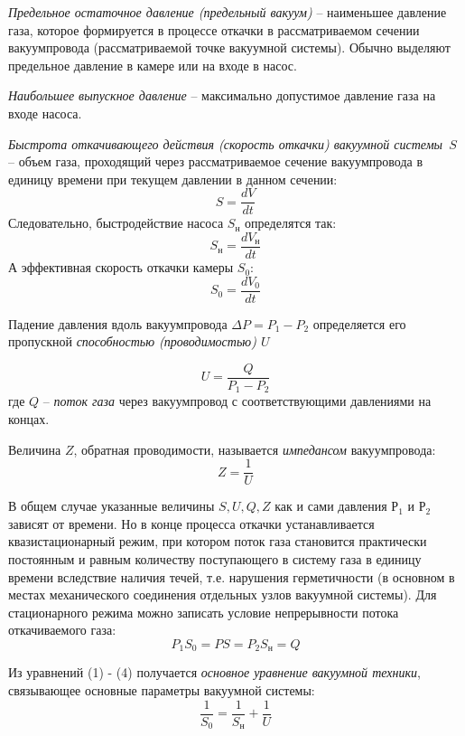 \documentclass[a4paper,12pt]{article}
\theoremstyle{plain} %
\theoremstyle{definition} %
\theoremstyle{remark} %
\begin{document}
\textit{Предельное остаточное давление (предельный вакуум)} -- наименьшее давление газа, которое формируется в процессе откачки в рассматриваемом сечении вакуумпровода (рассматриваемой точке вакуумной системы). Обычно выделяют предельное давление в камере или на входе в насос.

\textit{Наибольшее выпускное давление}  -- максимально допустимое давление газа на входе насоса.  

\textit{Быстрота откачивающего действия (скорость откачки) вакуумной \mbox{системы $S$} } -- объем газа, проходящий через рассматриваемое сечение вакуумпровода в единицу времени при текущем давлении в данном сечении:
\[S = \frac{d V}{dt} \]
Следовательно, быстродействие насоса $S_\text{н}$ определятся так:
\begin{equation}
S_\text{н} = \frac{d V_\text{н}}{dt}
\end{equation}
А эффективная скорость откачки камеры $S_0$:
\begin{equation}
S_0 = \frac{dV_0}{dt}
\end{equation}

Падение давления вдоль вакуумпровода $\Delta P = P_1 - P_2$ определяется его пропускной \textit{способностью (проводимостью) $U$}

\begin{equation}
U = \frac{Q}{P_1-P_2}
\end{equation}
где $Q$ -- \textit{поток газа} через вакуумпровод с соответствующими давлениями на концах.

Величина $Z$, обратная проводимости, называется \textit{импедансом} вакуумпровода:
\[Z = \frac{1}{U} \]

В общем случае указанные величины $S, U, Q, Z$ как и сами давления $Р_1$ и $Р_2$ зависят от времени. Но в конце процесса откачки устанавливается квазистационарный режим, при котором поток газа становится практически постоянным и равным количеству поступающего в систему газа в единицу времени вследствие наличия течей, т.е. нарушения герметичности (в основном в местах механического соединения отдельных узлов вакуумной системы). Для стационарного режима можно записать условие непрерывности потока откачиваемого газа:
\begin{equation}
P_1 S_0 = PS = P_2 S_\text{н} = Q
\end{equation}

Из уравнений (1) - (4) получается \textit{основное уравнение вакуумной техники}, связывающее основные параметры вакуумной системы:
\begin{equation}
\frac{1}{S_0} = \frac{1}{S_\text{н}} + \frac{1}{U}
\end{equation}
\end{document}
